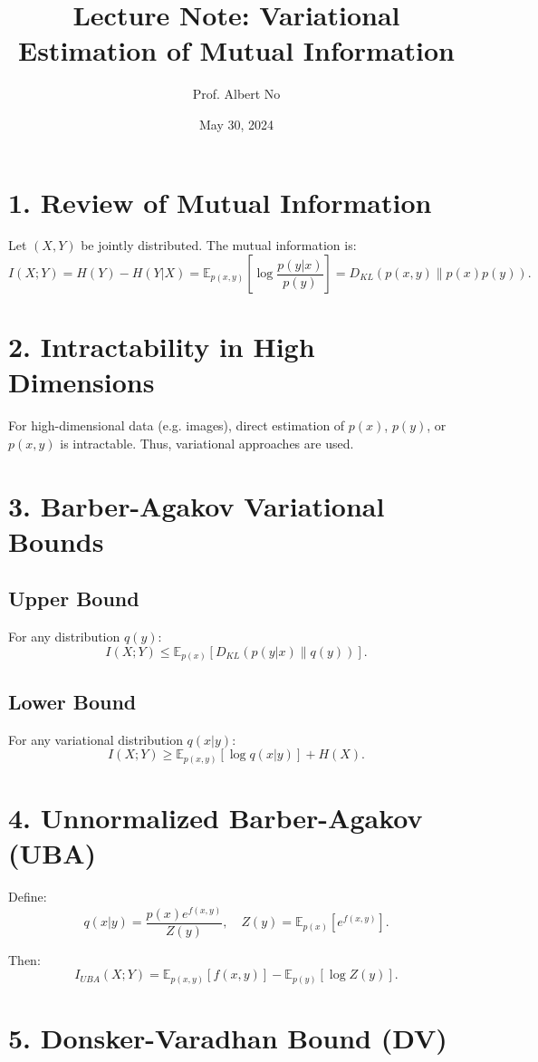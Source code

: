 \documentclass{article}
\title{Lecture Note: Variational Estimation of Mutual Information}
\author{Prof. Albert No}
\date{May 30, 2024}
\begin{document}
\maketitle

\section*{1. Review of Mutual Information}

Let $(X,Y)$ be jointly distributed. The mutual information is:
\[
I(X;Y) = H(Y) - H(Y|X) = \mathbb{E}_{p(x,y)} \left[ \log \frac{p(y|x)}{p(y)} \right] = D_{KL}(p(x,y)\|p(x)p(y)).
\]

\section*{2. Intractability in High Dimensions}

For high-dimensional data (e.g. images), direct estimation of $p(x)$, $p(y)$, or $p(x,y)$ is intractable. Thus, variational approaches are used.

\section*{3. Barber-Agakov Variational Bounds}

\subsection*{Upper Bound}
For any distribution $q(y)$:
\[
I(X;Y) \leq \mathbb{E}_{p(x)} \left[ D_{KL}(p(y|x) \| q(y)) \right].
\]

\subsection*{Lower Bound}
For any variational distribution $q(x|y)$:
\[
I(X;Y) \geq \mathbb{E}_{p(x,y)} \left[ \log q(x|y) \right] + H(X).
\]

\section*{4. Unnormalized Barber-Agakov (UBA)}

Define:
\[
q(x|y) = \frac{p(x) e^{f(x,y)}}{Z(y)}, \quad Z(y) = \mathbb{E}_{p(x)} \left[ e^{f(x,y)} \right].
\]

Then:
\[
I_{UBA}(X;Y) = \mathbb{E}_{p(x,y)}[f(x,y)] - \mathbb{E}_{p(y)}[\log Z(y)].
\]

\section*{5. Donsker-Varadhan Bound (DV)}
\end{document}
